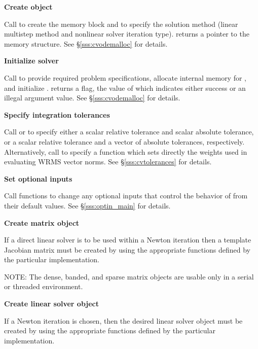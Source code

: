 \begin{Steps}
\item\label{i:cvode_create} 
  {\bf Create {\cvode} object}

  Call  
  to create the {\cvode} memory block and to specify the solution method
  (linear multistep method and nonlinear solver iteration type).
   returns a pointer to the {\cvode} memory structure.
  See \S\ref{sss:cvodemalloc} for details.

\item\label{i:cvode_malloc} 
  {\bf Initialize {\cvode} solver}

  Call  
  to provide required problem specifications, allocate internal memory for
  {\cvode}, and initialize {\cvode}.
   returns a flag, the value of which indicates either success or
  an illegal argument value.  See \S\ref{sss:cvodemalloc} for details.
  
\item
  {\bf Specify integration tolerances}

  Call  or 
  to specify either a scalar relative tolerance and scalar absolute tolerance, or
  a scalar relative tolerance and a vector of absolute tolerances, respectively.
  Alternatively, call  to specify a function which sets 
  directly the weights used in evaluating WRMS vector norms.
  See \S\ref{sss:cvtolerances} for details.

\item
  {\bf Set optional inputs}

  Call  functions to change any
  optional inputs that control the behavior of {\cvode} from their default values.
  See \S\ref{sss:optin_main} for details.

\item\label{i:matrix} 
  {\bf Create matrix object}
 
  If a direct linear solver is to be used within a Newton iteration
  then a template Jacobian matrix must be created by using the
  appropriate functions defined by the particular {\sunmatrix}
  implementation. 
  
NOTE: The dense, banded, and sparse matrix objects are usable only in a
serial or threaded environment.

\item\label{i:lin_solver} 
  {\bf Create linear solver object}
 
  If a Newton iteration is chosen, then the desired linear solver
  object must be created by using the appropriate functions defined by
  the particular {\sunlinsol} implementation.
  

\end{Steps}
